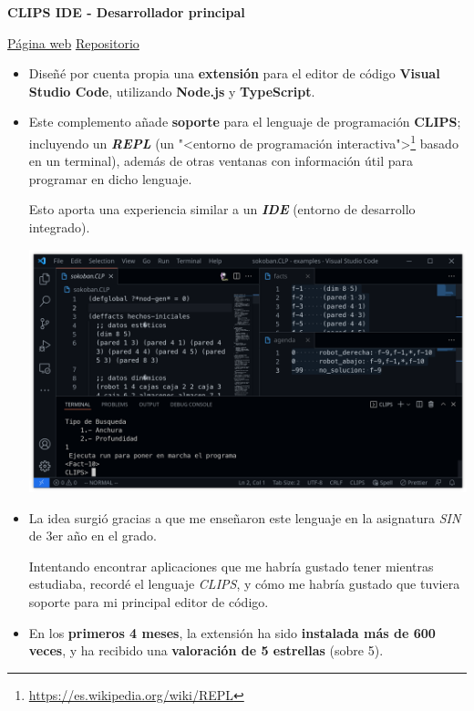 \documentclass[letterpaper, 12pt, dvipsnames]{article}
\begin{document}
\begin{center}
    \large{\textbf{CLIPS IDE - Desarrollador principal}}\par
    \vspace{.2em}
    \href{https://marketplace.visualstudio.com/items?itemName=algono.clips-ide}{Página web}
    \hspace{1em}\href{https://github.com/algono/clips-ide-vscode}{Repositorio}
\end{center}
\begin{itemize}
    \item Diseñé por cuenta propia una \textbf{extensión} para el editor de código \textbf{Visual Studio Code}, utilizando \textbf{Node.js} y \textbf{TypeScript}.
    \item Este complemento añade \textbf{soporte} para el lenguaje de programación \textbf{CLIPS}; incluyendo un \textbf{\emph{REPL}} (un "<entorno de programación interactiva">\footnote{\url{https://es.wikipedia.org/wiki/REPL}} basado en un terminal), además de otras ventanas con información útil para programar en dicho lenguaje.

          Esto aporta una experiencia similar a un \textbf{\emph{IDE}} (entorno de desarrollo integrado).

          \includegraphics[width=.9415\textwidth]{vscode-clips-ide.png}

    \item La idea surgió gracias a que me enseñaron este lenguaje en la asignatura \emph{SIN} de 3er año en el grado.

          Intentando encontrar aplicaciones que me habría gustado tener mientras estudiaba, recordé el lenguaje \emph{CLIPS}, y cómo me habría gustado que tuviera soporte para mi principal editor de código.
    \item En los \textbf{primeros 4 meses}, la extensión ha sido \textbf{instalada más de 600 veces}, y ha recibido una \textbf{valoración de 5 estrellas} (sobre 5).
\end{itemize}
\end{document}
